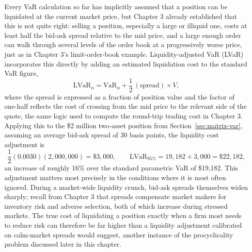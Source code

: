 \documentclass[../ai_in_finance]{subfiles}
\begin{document}
Every VaR calculation so far has implicitly assumed that a position can be liquidated at the current market price, but Chapter 3 already established that this is not quite right: selling a position, especially a large or illiquid one, costs at least half the bid-ask spread relative to the mid price, and a large enough order can walk through several levels of the order book at a progressively worse price, just as in Chapter 3's limit-order-book example. Liquidity-adjusted VaR (LVaR) incorporates this directly by adding an estimated liquidation cost to the standard VaR figure,
\begin{equation*}
\text{LVaR}_\alpha = \text{VaR}_\alpha + \frac{1}{2}\,(\text{spread}) \times V,
\end{equation*}
where the spread is expressed as a fraction of position value and the factor of one-half reflects the cost of crossing from the mid price to the relevant side of the quote, the same logic used to compute the round-trip trading cost in Chapter 3. Applying this to the \$2 million two-asset position from Section~\ref{sec:matrix-var}, assuming an average bid-ask spread of 30 basis points, the liquidity cost adjustment is
\begin{equation*}
\frac{1}{2}(0.0030)(2{,}000{,}000) = \$3{,}000, \qquad \text{LVaR}_{95\%} = 19{,}182 + 3{,}000 = \$22{,}182,
\end{equation*}
an increase of roughly 16\% over the standard parametric VaR of \$19,182.
This adjustment matters most precisely in the conditions where it is most often ignored. During a market-wide liquidity crunch, bid-ask spreads themselves widen sharply; recall from Chapter 3 that spreads compensate market makers for inventory risk and adverse selection, both of which increase during stressed markets. The true cost of liquidating a position exactly when a firm most needs to reduce risk can therefore be far higher than a liquidity adjustment calibrated on calm-market spreads would suggest, another instance of the procyclicality problem discussed later in this chapter.
\end{document}
